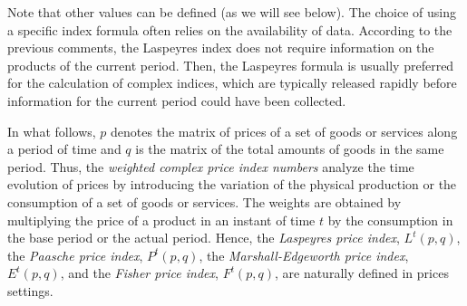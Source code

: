 Note that other values can be defined (as we will see below). The choice of using a specific index formula often relies on the availability of data. According to the previous comments, the Laspeyres index does not require information on the products of the current period. Then, the Laspeyres formula is usually preferred for the calculation of complex indices, which are typically released rapidly before information for the current period could have been collected.




In what follows,  $p$ denotes the matrix of prices of a set of goods or services along a period of time and $q$ is the matrix of the total amounts of goods in the same period. Thus, the \emph{weighted complex price index numbers} analyze the time evolution of prices by introducing the variation of the physical production or the consumption of a set of goods or services.  The weights are obtained by multiplying the price of a product in an instant of time $t$ by the consumption in the base period or the actual period. Hence, the \emph{Laspeyres price index}, $L^t(p,q)$, the \emph{Paasche price index}, $P^t(p,q)$, the \emph{Marshall-Edgeworth price index}, $E^t(p,q)$, and the \emph{Fisher price index}, $F^t(p,q)$, are naturally defined in prices settings.



%
%
%
%
%
%
%
%
%
%

